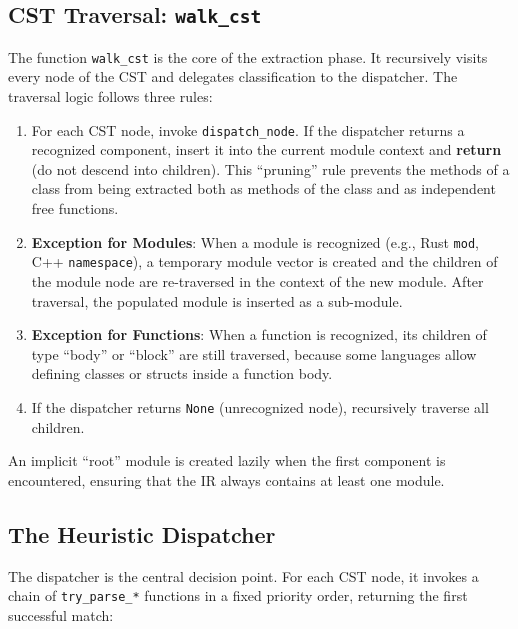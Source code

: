 \subsection{CST Traversal: \texttt{walk\_cst}}
\label{sec:walk_cst}

The function \texttt{walk\_cst} is the core of the extraction phase. It recursively visits every node of the CST and delegates classification to the dispatcher. The traversal logic follows three rules:

\begin{enumerate}
  \item For each CST node, invoke \texttt{dispatch\_node}. If the dispatcher returns a recognized component, insert it into the current module context and \textbf{return} (do not descend into children). This ``pruning'' rule prevents the methods of a class from being extracted both as methods of the class and as independent free functions.
  \item \textbf{Exception for Modules}: When a module is recognized (e.g., Rust \texttt{mod}, C++ \texttt{namespace}), a temporary module vector is created and the children of the module node are re-traversed in the context of the new module. After traversal, the populated module is inserted as a sub-module.
  \item \textbf{Exception for Functions}: When a function is recognized, its children of type ``body'' or ``block'' are still traversed, because some languages allow defining classes or structs inside a function body.
  \item If the dispatcher returns \texttt{None} (unrecognized node), recursively traverse all children.
\end{enumerate}

An implicit ``root'' module is created lazily when the first component is encountered, ensuring that the IR always contains at least one module.

\subsection{The Heuristic Dispatcher}
\label{sec:dispatcher}

The dispatcher is the central decision point. For each CST node, it invokes a chain of \texttt{try\_parse\_*} functions in a fixed priority order, returning the first successful match:

